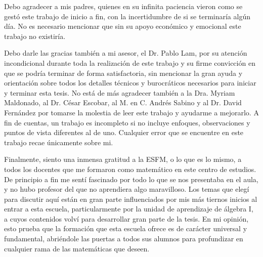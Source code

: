 {\setlength\parindent{1em}
Debo agradecer a mis padres, quienes en su infinita paciencia vieron como se gestó este trabajo de inicio a fin, con la incertidumbre de si se terminaría algún día. No es necesario mencionar que sin su apoyo económico y emocional este trabajo no existiría.

Debo darle las gracias también a mi asesor, el Dr. Pablo Lam, por su atención incondicional durante toda la realización de este trabajo y su firme convicción en que se podría terminar de forma satisfactoria, sin mencionar la gran ayuda y orientación sobre todos los detalles técnicos y burocráticos necesarios para iniciar y terminar esta tesis. No está de más agradecer también a la Dra. Myriam Maldonado, al Dr. César Escobar, al M. en C. Andrés Sabino y al Dr. David Fernández por tomarse la molestia de leer este trabajo y ayudarme a mejorarlo. A fin de cuentas, un trabajo es incompleto si no incluye enfoques, observaciones y puntos de vista diferentes al de uno. Cualquier error que se encuentre en este trabajo recae únicamente sobre mi.

Finalmente, siento una inmensa gratitud a la ESFM, o lo que es lo mismo, a todos los docentes que me formaron como matemático en este centro de estudios. De principio a fin me sentí fascinado por todo lo que se nos presentaba en el aula, y no hubo profesor del que no aprendiera algo maravilloso. Los temas que elegí para discutir aquí están en gran parte influenciados por mis más tiernos inicios al entrar a esta escuela, particularmente por la unidad de aprendizaje de álgebra I, a cuyos contenidos volví para desarrollar gran parte de la tesis. En mi opinión, esto prueba que la formación que esta escuela ofrece es de carácter universal y fundamental, abriéndole las puertas a todos sus alumnos para profundizar en cualquier rama de las matemáticas que deseen.}

\newpage
\thispagestyle{empty}
\

\newpage
{}
\thispagestyle{plain}
\tableofcontents
\newpage
\thispagestyle{empty}
\












